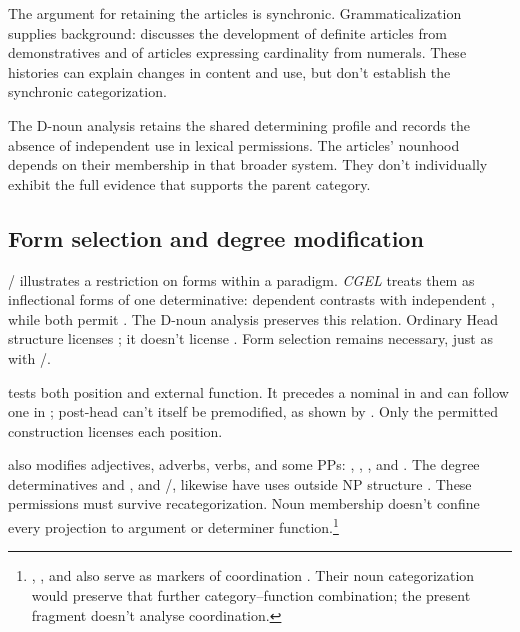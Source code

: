 \documentclass[12pt]{article}
\begin{document}
The argument for retaining the articles is synchronic. Grammaticalization supplies background: \textcite[331--336]{lyons1999} discusses the development of definite articles from demonstratives and of articles expressing cardinality from numerals. These histories can explain changes in content and use, but don't establish the synchronic categorization.

The D-noun analysis retains the shared determining profile and records the absence of independent use in lexical permissions. The articles' nounhood depends on their membership in that broader system. They don't individually exhibit the full evidence that supports the parent category.

\subsection{Form selection and degree modification}\label{sec:enough}

/ illustrates a restriction on forms within a paradigm. \textit{CGEL} treats them as inflectional forms of one determinative: dependent  contrasts with independent , while both permit  \citep[389--390]{huddleston2002}. The D-noun analysis preserves this relation. Ordinary Head structure licenses ; it doesn't license . Form selection remains necessary, just as with /.

 tests both position and external function. It precedes a nominal in  and can follow one in ; post-head  can't itself be premodified, as shown by  \citep[396--397, 445]{huddleston2002}. Only the permitted construction licenses each position.

 also modifies adjectives, adverbs, verbs, and some PPs: , , , and  \citep[396--397]{huddleston2002}. The degree determinatives  and , and /, likewise have uses outside NP structure \citep[390, 395--397]{huddleston2002}. These permissions must survive recategorization. Noun membership doesn't confine every projection to argument or determiner function.\footnote{, , and  also serve as markers of coordination \citep[1305, 1308]{huddleston2002}. Their noun categorization would preserve that further category--function combination; the present fragment doesn't analyse coordination.}
\end{document}
